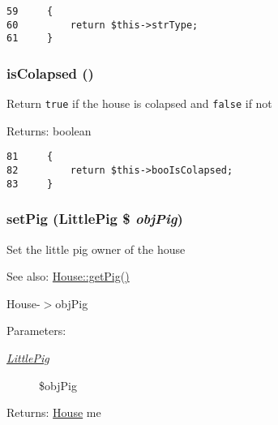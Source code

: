 \begin{Code}\begin{verbatim}59     {
60         return $this->strType;
61     }
\end{verbatim}
\end{Code}


\hypertarget{class_house_17f029203fb995258650c19e2616e669}{
\subsubsection[{isColapsed}]{\setlength{\rightskip}{0pt plus 5cm}isColapsed ()}}
\label{class_house_17f029203fb995258650c19e2616e669}


Return {\tt true} if the house is colapsed and {\tt false} if not

\begin{Desc}
\item[Returns:]boolean \end{Desc}


\begin{Code}\begin{verbatim}81     {
82         return $this->booIsColapsed;
83     }
\end{verbatim}
\end{Code}


\hypertarget{class_house_5fbf3e8f1af77b77aba13d24cd3218e0}{
\subsubsection[{setPig}]{\setlength{\rightskip}{0pt plus 5cm}setPig ({\bf LittlePig} \$ {\em objPig})}}
\label{class_house_5fbf3e8f1af77b77aba13d24cd3218e0}


Set the little pig owner of the house

\begin{Desc}
\item[See also:]\hyperlink{class_house_6b0a38021f87bca50710aba818be2809}{House::getPig()} 

House-$>$objPig \end{Desc}
\begin{Desc}
\item[Parameters:]
\begin{description}
\item[{\em \hyperlink{class_little_pig}{LittlePig}}]\$objPig \end{description}
\end{Desc}
\begin{Desc}
\item[Returns:]\hyperlink{class_house}{House} me \end{Desc}


